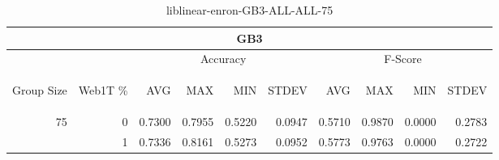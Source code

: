 \begin{center}
\begin{table}[htbp] 
 \begin{center}
\begin{tabular}{ | r | r | r | r | r | r | r | r | r | r |}
\hline
\multicolumn{10}{|c|}{GB3}\\
\hline
 & & \multicolumn{4}{|c|}{Accuracy} & \multicolumn{4}{|c|}{F-Score}\\ \cline{3-10}
\begin{sideways}Group Size\end{sideways} & \begin{sideways}Web1T \%\end{sideways} & \begin{sideways}AVG\end{sideways} & \begin{sideways}MAX\end{sideways} & \begin{sideways}MIN\end{sideways} & \begin{sideways}STDEV\end{sideways} & \begin{sideways}AVG\end{sideways} & \begin{sideways}MAX\end{sideways} & \begin{sideways}MIN\end{sideways} & \begin{sideways}STDEV\end{sideways}\\
\hline
\multirow{1}{*}{75}
 & 0 & 0.7300 & 0.7955 & 0.5220 & 0.0947 & 0.5710 & 0.9870 & 0.0000 & 0.2783\\ \cline{2-10}
 & 1 & 0.7336 & 0.8161 & 0.5273 & 0.0952 & 0.5773 & 0.9763 & 0.0000 & 0.2722\\ \cline{2-10}
\hline
\end{tabular}
\caption{liblinear-enron-GB3-ALL-ALL-75}
\label{table:liblinear-enron-GB3-ALL-ALL-75}
\end{center}
 \end{table}
\end{center}

